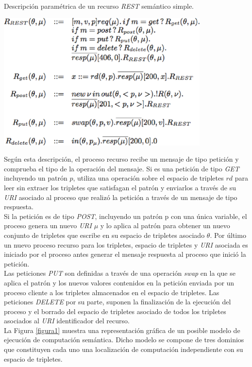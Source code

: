 \begin{table}
\vspace{2.4in}
\caption{Descripci\'on param\'etrica de un recurso \textit{REST} sem\'antico simple.}
\vspace{5mm}
\includegraphics[width=0.8\textwidth]{tabla4}
\label{tabla4}
\end{table}


Seg\'un esta descripci\'on, el proceso recurso recibe un mensaje de tipo petici\'on y comprueba el tipo de la operaci\'on del mensaje.
Si es una petici\'on de tipo \textit{GET} incluyendo un patr\'on $p$, utiliza una operaci\'on sobre el espacio de tripletes $rd$ para leer sin extraer los tripletes que satisfagan el patr\'on y enviarlos a trav\'es de su \textit{URI} asociado al proceso que realiz\'o la petici\'on a trav\'es de un mensaje de tipo respuesta.\\
Si la petici\'on es de tipo \textit{POST}, incluyendo un patr\'on p con una \'unica variable, el proceso genera un nuevo \textit{URI} $\mu$ y lo aplica al patr\'on para obtener un nuevo conjunto de tripletes que escribe en su espacio de tripletes asociado $\theta$. Por \'ultimo un nuevo proceso recurso para los tripletes, espacio de tripletes y \textit{URI} asociada es iniciado por el proceso antes generar el mensaje respuesta al proceso que inici\'o la petici\'on.\\
Las peticiones \textit{PUT} son definidas a trav\'es de una operaci\'on \textit{swap} en la que se aplica el patr\'on y los nuevos valores contenidos en la petici\'on enviada por un proceso cliente a los tripletes almacenados en el espacio de tripletes. Las peticiones \textit{DELETE} por su parte, suponen la finalizaci\'on de la ejecuci\'on del proceso y el borrado del espacio de tripletes asociado de todos los tripletes asociados al \textit{URI} identificador del recurso.\\
La Figura \ref{figura1} muestra una representaci\'on gr\'afica de un posible modelo de ejecuci\'on de computaci\'on sem\'antica. Dicho modelo se compone de tres dominios que constituyen cada uno una localizaci\'on de computaci\'on independiente con su espacio de tripletes.\\

